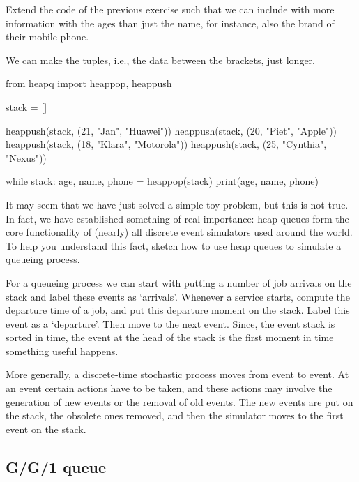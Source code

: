 \documentclass{scrartcl}
\begin{document}
\begin{exercise}
  Extend the code of the previous exercise such that we can include  with more information with the ages than just the name, for instance, also the brand of their mobile phone. 
\begin{solution}
We can make the  tuples, i.e., the data between the brackets,  just longer. 

\begin{pyblock}
from heapq import heappop, heappush

stack = []

heappush(stack, (21, "Jan", "Huawei"))
heappush(stack, (20, "Piet", "Apple"))
heappush(stack, (18, "Klara", "Motorola"))
heappush(stack, (25, "Cynthia", "Nexus"))

while stack:
    age, name, phone = heappop(stack)
    print(age, name, phone)
\end{pyblock}


\end{solution}
\end{exercise}


\begin{exercise}
  It may seem that we have just solved a simple toy problem, but this is not true. In fact, we have established something of real importance: heap queues form the core functionality of (nearly) all discrete event simulators used around the world.  To help you understand this fact, sketch how to use heap queues  to simulate a queueing process. 
  \begin{solution}
    For a queueing process we can start with putting a number of job arrivals on the stack and label these events as `arrivals'. Whenever a service starts, compute the departure time of a job, and put this departure moment on the stack. Label this event as a `departure'. Then move to the next event. Since, the event stack is sorted in time, the event at the head of the stack is the first moment in time something useful happens. 

More generally, a discrete-time stochastic process moves from event to event. At an event certain actions have to be taken, and these actions may involve the generation of new events or the removal of old events. The new events are put on the stack, the obsolete ones removed, and then the simulator moves to the first event on the stack. 
  \end{solution}
\end{exercise}



\subsection{G/G/1 queue}
\label{sec:gg1-queue}
\end{document}
